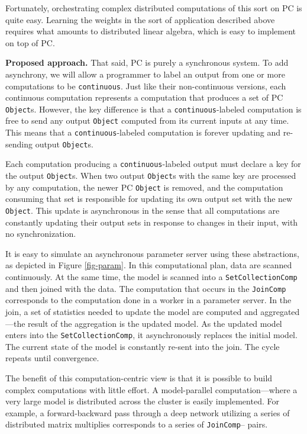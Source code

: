 Fortunately, orchestrating complex distributed computations of this sort on PC is quite easy.  Learning the weights
in the sort of application described above requires what amounts to distributed linear algebra, which is easy to implement on top of PC.

\vspace{5 pt} 
\noindent
\textbf{Proposed approach.}
That said, PC is purely a synchronous system.  To add asynchrony,
we will allow a programmer to label an output from one or more computations to be  
\texttt{continuous}.  Just like their non-continuous
versions, each
continuous computation represents a computation that produces a set of PC \texttt{Object}s.
However, the key difference is that a \texttt{continuous}-labeled 
computation is free to send any output \texttt{Object} computed from its current inputs
at any time.
This means that a \texttt{continuous}-labeled computation is forever updating and re-sending output \texttt{Object}s.

Each computation producing a \texttt{continuous}-labeled output must declare a key for the output \texttt{Object}s.  When
two output \texttt{Object}s with the same key are processed by any computation, the newer PC \texttt{Object} is removed, and the computation consuming
that set is responsible for updating its own output set with the new \texttt{Object}.  This update is asynchronous in the sense that
all computations are constantly updating their output sets in response to changes in their input, with no synchronization.

It is easy to simulate an asynchronous 
parameter server using these abstractions, as depicted in Figure \ref{fig-param}.  In this computational plan, data are
scanned continuously.  At the same time, the model is scanned into a \texttt{SetCollectionComp} and then joined with the 
data.  The computation that occurs in the \texttt{JoinComp}
corresponds to the computation done in a worker in a parameter server.
In the join, a set of statistics needed to update the model
are computed and aggregated---the result of the aggregation is the updated model.
As the updated model enters into the \texttt{SetCollectionComp}, it asynchronously replaces the initial model.  The current
state of the model is constantly re-sent into the join.  The cycle
repeats until convergence.

The benefit of this computation-centric view is that it is possible to build
complex computations with little effort.  A model-parallel computation---where a very large model is distributed across the cluster
is easily implemented.  For example,
a forward-backward pass through a deep network utilizing a series of distributed matrix multiplies corresponds
to a series of \texttt{JoinComp}--\texttt{} pairs.

